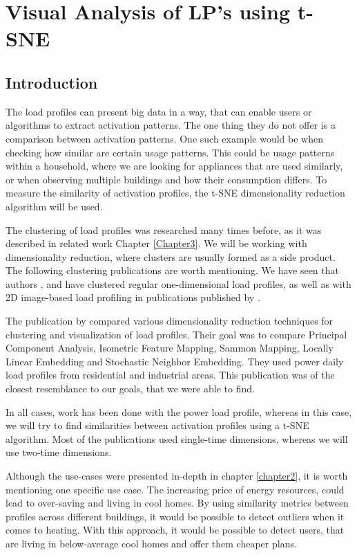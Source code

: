 \chapter{Visual Analysis of LP's using t-SNE} 

\label{chapter5} 

\section{Introduction}

The load profiles can present big data in a way, that can enable users or algorithms to extract activation patterns.
The one thing they do not offer is a comparison between activation patterns.
One such example would be when checking how similar are certain usage patterns.
This could be usage patterns within a household, where we are looking for appliances that are used similarly,
or when observing multiple buildings and how their consumption differs. 
To measure the similarity of activation profiles, the t-SNE dimensionality reduction algorithm will be used.

The clustering of load profiles was researched many times before, as it was described in related work Chapter \ref{Chapter3}.
We will be working with dimensionality reduction, where clusters are usually formed as a side product.
The following clustering publications are worth mentioning.
We have seen that authors \cite{GERBEC2005}, \cite{Jeong2021} and \cite{Joana2012} have clustered regular one-dimensional load profiles, as well as with 2D image-based load profiling in publications published by \cite{Park2019}. 

The publication by \cite{sne_energ} compared various dimensionality reduction techniques for clustering and visualization of load profiles.
Their goal was to compare Principal Component Analysis, Isometric Feature Mapping, Sammon Mapping, Locally Linear Embedding and Stochastic Neighbor Embedding.
They used power daily load profiles from residential and industrial areas.
This publication was of the closest resemblance to our goals, that we were able to find. 

In all cases, work has been done with the power load profile, whereas in this case, we will try to find similarities between activation profiles using a t-SNE algorithm.
Most of the publications used single-time dimensions, whereas we will use two-time dimensions.

Although the use-cases were presented in-depth in chapter \ref{chapter2}, it is worth mentioning one specific use case.
The increasing price of energy resources, could lead to over-saving and living in cool homes.
By using similarity metrics between profiles across different buildings, it would be possible to detect outliers when it comes to heating. 
With this approach, it would be possible to detect users, that are living in below-average cool homes and offer them cheaper plans. 


